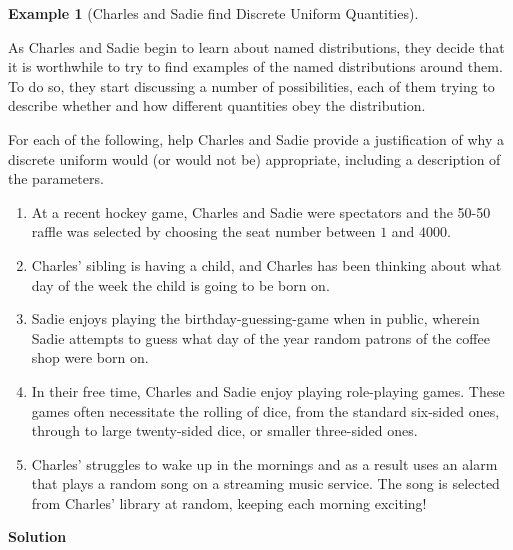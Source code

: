 \documentclass[
  letterpaper,
  DIV=11,
  numbers=noendperiod]{scrreprt}
\providecommand{\tightlist}{%
  \setlength{\itemsep}{0pt}\setlength{\parskip}{0pt}}\usepackage{longtable,booktabs,array}
\theoremstyle{definition}
\theoremstyle{definition}
\newtheorem{example}{Example}[chapter]
\theoremstyle{definition}
\theoremstyle{remark}
\begin{document}
\begin{example}[Charles and Sadie find Discrete Uniform
Quantities]\protect\hypertarget{exm-discrete-uniform}{}\label{exm-discrete-uniform}

As Charles and Sadie begin to learn about named distributions, they
decide that it is worthwhile to try to find examples of the named
distributions around them. To do so, they start discussing a number of
possibilities, each of them trying to describe whether and how different
quantities obey the distribution.

For each of the following, help Charles and Sadie provide a
justification of why a discrete uniform would (or would not be)
appropriate, including a description of the parameters.

\begin{enumerate}
\def\labelenumi{\alph{enumi}.}
\tightlist
\item
  At a recent hockey game, Charles and Sadie were spectators and the
  50-50 raffle was selected by choosing the seat number between \(1\)
  and \(4000\).
\item
  Charles' sibling is having a child, and Charles has been thinking
  about what day of the week the child is going to be born on.
\item
  Sadie enjoys playing the birthday-guessing-game when in public,
  wherein Sadie attempts to guess what day of the year random patrons of
  the coffee shop were born on.
\item
  In their free time, Charles and Sadie enjoy playing role-playing
  games. These games often necessitate the rolling of dice, from the
  standard six-sided ones, through to large twenty-sided dice, or
  smaller three-sided ones.
\item
  Charles' struggles to wake up in the mornings and as a result uses an
  alarm that plays a random song on a streaming music service. The song
  is selected from Charles' library at random, keeping each morning
  exciting!
\end{enumerate}

\begin{tcolorbox}[enhanced jigsaw, colback=white, colframe=quarto-callout-color-frame, arc=.35mm, leftrule=.75mm, rightrule=.15mm, opacityback=0, breakable, bottomrule=.15mm, left=2mm, toprule=.15mm]

\vspace{-3mm}\textbf{Solution}\vspace{3mm}


\end{tcolorbox}
\end{example}
\end{document}
